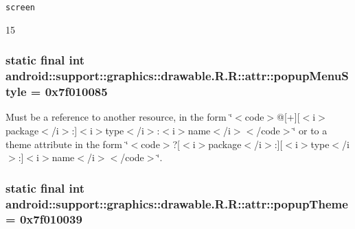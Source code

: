 {\tt screen}

15\hypertarget{classandroid_1_1support_1_1graphics_1_1drawable_1_1_r_1_1attr_633eea01d2e98d7db9d3a52fa59bce32}{
\subsubsection[{popupMenuStyle}]{\setlength{\rightskip}{0pt plus 5cm}static final int android::support::graphics::drawable.R.R::attr::popupMenuStyle = 0x7f010085}}
\label{classandroid_1_1support_1_1graphics_1_1drawable_1_1_r_1_1attr_633eea01d2e98d7db9d3a52fa59bce32}


Must be a reference to another resource, in the form \char`\"{}$<$code$>$@\mbox{[}+\mbox{]}\mbox{[}$<$i$>$package$<$/i$>$:\mbox{]}$<$i$>$type$<$/i$>$:$<$i$>$name$<$/i$>$$<$/code$>$\char`\"{} or to a theme attribute in the form \char`\"{}$<$code$>$?\mbox{[}$<$i$>$package$<$/i$>$:\mbox{]}\mbox{[}$<$i$>$type$<$/i$>$:\mbox{]}$<$i$>$name$<$/i$>$$<$/code$>$\char`\"{}. \hypertarget{classandroid_1_1support_1_1graphics_1_1drawable_1_1_r_1_1attr_a944bcad00543e2919111d3f108dc897}{
\subsubsection[{popupTheme}]{\setlength{\rightskip}{0pt plus 5cm}static final int android::support::graphics::drawable.R.R::attr::popupTheme = 0x7f010039}}
\label{classandroid_1_1support_1_1graphics_1_1drawable_1_1_r_1_1attr_a944bcad00543e2919111d3f108dc897}


